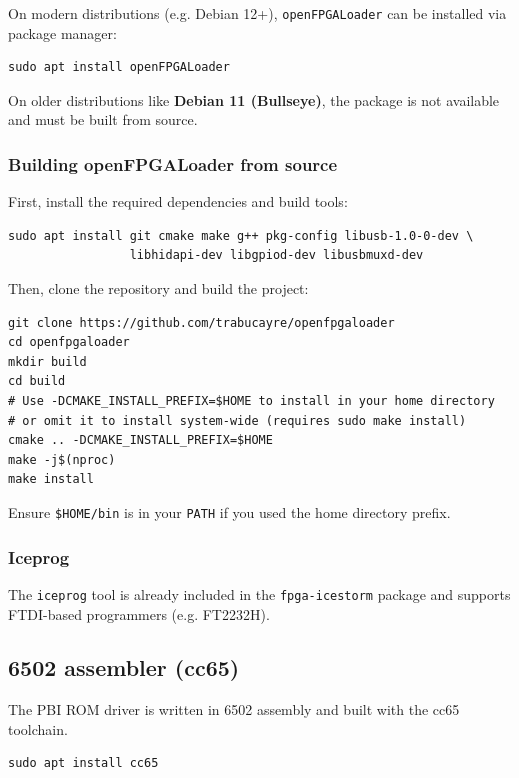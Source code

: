 \documentclass[11pt,a4paper]{article}
\newcommand{\cmd}[1]{\texttt{#1}}
\newcommand{\file}[1]{\texttt{#1}}
\begin{document}
On modern distributions (e.g. Debian 12+), \cmd{openFPGALoader} can be installed via package manager:

\begin{lstlisting}[style=shell]
sudo apt install openFPGALoader
\end{lstlisting}

On older distributions like \textbf{Debian 11 (Bullseye)}, the package is not available and must be built from source.

\subsubsection{Building openFPGALoader from source}

First, install the required dependencies and build tools:

\begin{lstlisting}[style=shell]
sudo apt install git cmake make g++ pkg-config libusb-1.0-0-dev \
                 libhidapi-dev libgpiod-dev libusbmuxd-dev
\end{lstlisting}

Then, clone the repository and build the project:

\begin{lstlisting}[style=shell]
git clone https://github.com/trabucayre/openfpgaloader
cd openfpgaloader
mkdir build
cd build
# Use -DCMAKE_INSTALL_PREFIX=$HOME to install in your home directory
# or omit it to install system-wide (requires sudo make install)
cmake .. -DCMAKE_INSTALL_PREFIX=$HOME
make -j$(nproc)
make install
\end{lstlisting}

Ensure \file{\$HOME/bin} is in your \cmd{PATH} if you used the home directory prefix.

\subsubsection{Iceprog}
The \cmd{iceprog} tool is already included in the \cmd{fpga-icestorm} package and supports FTDI-based programmers (e.g. FT2232H).

\subsection{6502 assembler (cc65)}

The PBI ROM driver is written in 6502 assembly and built with the
cc65 toolchain.

\begin{lstlisting}[style=shell]
sudo apt install cc65
\end{lstlisting}
\end{document}
